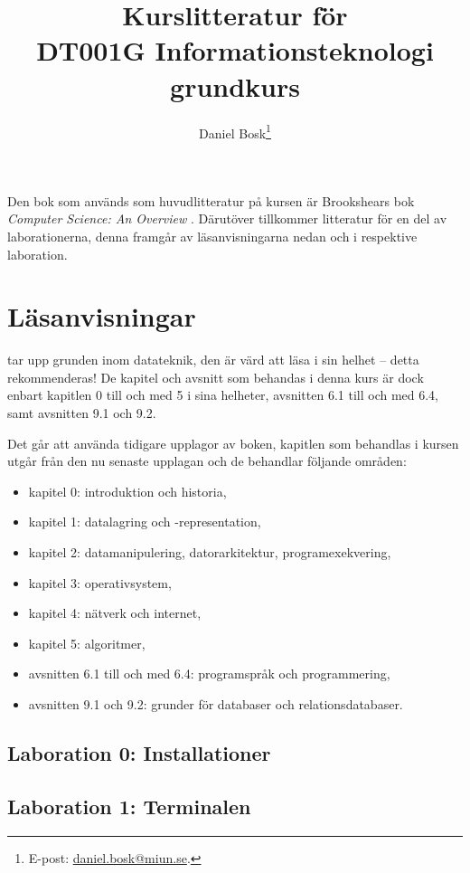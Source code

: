 \documentclass[a4paper,11pt,logo]{miunart}
\title{Kurslitteratur för\\DT001G Informationsteknologi grundkurs}
\author{Daniel Bosk\footnote{%
	E-post: \href{mailto:daniel.bosk@miun.se}{daniel.bosk@miun.se}.
}}
\date{\svnId}
\begin{document}
\maketitle
\noindent
Den bok som används som huvudlitteratur på kursen är Brookshears bok 
\emph{Computer Science: An Overview} \citep{Brookshear2012csa}.
Därutöver tillkommer litteratur för en del av laborationerna, denna framgår av 
läsanvisningarna nedan och i respektive laboration.


\section*{Läsanvisningar}
\noindent
\citet{Brookshear2012csa} tar upp grunden inom datateknik, den är värd att läsa 
i sin helhet -- detta rekommenderas!
De kapitel och avsnitt som behandas i denna kurs är dock enbart kapitlen 0 till 
och med 5 i sina helheter, avsnitten 6.1 till och med 6.4, samt avsnitten 9.1 
och 9.2.

Det går att använda tidigare upplagor av boken, kapitlen som behandlas i kursen 
utgår från den nu senaste upplagan \citep{Brookshear2012csa} och de behandlar 
följande områden:
\begin{itemize}
	\item kapitel 0: introduktion och historia,
	\item kapitel 1: datalagring och -representation,
	\item kapitel 2: datamanipulering, datorarkitektur, programexekvering,
	\item kapitel 3: operativsystem,
	\item kapitel 4: nätverk och internet,
	\item kapitel 5: algoritmer,
	\item avsnitten 6.1 till och med 6.4: programspråk och programmering,
	\item avsnitten 9.1 och 9.2: grunder för databaser och relationsdatabaser.
\end{itemize}


\subsection*{Laboration 0: Installationer}
\noindent



\subsection*{Laboration 1: Terminalen}
\noindent

\end{document}
